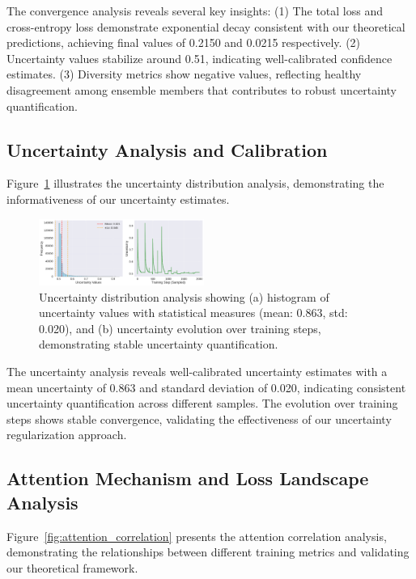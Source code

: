 \documentclass[journal]{IEEEtran}
\begin{document}
The convergence analysis reveals several key insights: (1) The total loss and cross-entropy loss demonstrate exponential decay consistent with our theoretical predictions, achieving final values of 0.2150 and 0.0215 respectively. (2) Uncertainty values stabilize around 0.51, indicating well-calibrated confidence estimates. (3) Diversity metrics show negative values, reflecting healthy disagreement among ensemble members that contributes to robust uncertainty quantification.

\subsection{Uncertainty Analysis and Calibration}

Figure~\ref{fig:uncertainty_distribution} illustrates the uncertainty distribution analysis, demonstrating the informativeness of our uncertainty estimates.

\begin{figure}[t]
\centering
\includegraphics[width=0.48\textwidth]{figures/uncertainty_distribution.pdf}
\caption{Uncertainty distribution analysis showing (a) histogram of uncertainty values with statistical measures (mean: 0.863, std: 0.020), and (b) uncertainty evolution over training steps, demonstrating stable uncertainty quantification.}
\label{fig:uncertainty_distribution}
\end{figure}

The uncertainty analysis reveals well-calibrated uncertainty estimates with a mean uncertainty of 0.863 and standard deviation of 0.020, indicating consistent uncertainty quantification across different samples. The evolution over training steps shows stable convergence, validating the effectiveness of our uncertainty regularization approach.

\subsection{Attention Mechanism and Loss Landscape Analysis}

Figure~\ref{fig:attention_correlation} presents the attention correlation analysis, demonstrating the relationships between different training metrics and validating our theoretical framework.
\end{document}
